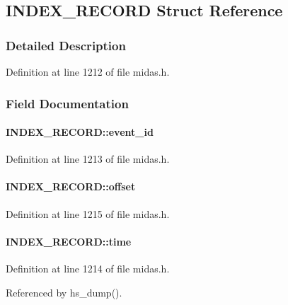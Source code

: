 \subsection{INDEX\_\-RECORD Struct Reference}
\label{structINDEX__RECORD}


\subsubsection{Detailed Description}


Definition at line 1212 of file midas.h.

\subsubsection{Field Documentation}
\paragraph[{event\_\-id}]{ {\bf INDEX\_\-RECORD::event\_\-id}}\hfill\label{structINDEX__RECORD_ab893c0617053652c09947d7d24740f27}


Definition at line 1213 of file midas.h.
\paragraph[{offset}]{ {\bf INDEX\_\-RECORD::offset}}\hfill\label{structINDEX__RECORD_aa5cd05f92f95ebccc6f2c7fdf3b3f1a9}


Definition at line 1215 of file midas.h.
\paragraph[{time}]{ {\bf INDEX\_\-RECORD::time}}\hfill\label{structINDEX__RECORD_a729b9b6590da0af9a8c9984d0d58a8d7}


Definition at line 1214 of file midas.h.

Referenced by hs\_\-dump().